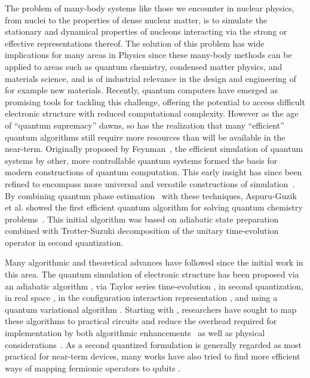 \documentclass[10pt]{article}
\begin{document}
The problem of many-body systems like those we encounter in nuclear physics, from nuclei to the properties of dense nuclear matter,  is to simulate the stationary and dynamical 
properties of nucleons interacting via the strong or effective representations thereof. The solution of this problem has wide implications for many areas in Physics since these many-body methods can be applied to areas such as
quantum chemistry, condensed matter physics, and materials science,
and is of industrial relevance in the design and engineering of for example new materials. 
Recently, quantum computers
have emerged as promising tools for tackling this challenge, offering
the potential to access difficult electronic structure with reduced
computational complexity. However as the age of ``quantum supremacy''
dawns, so has the realization that many ``efficient'' quantum
algorithms still require more resources than will be available in the
near-term.
Originally proposed by Feynman~\cite{Feynman1982}, the efficient
simulation of quantum systems by other, more controllable quantum
systems formed the basis for modern constructions of quantum
computation.  This early insight has since been refined to encompass
more universal and versatile constructions of
simulation~\cite{Lloyd1996,Abrams1997}. By combining quantum phase
estimation~\cite{Kitaev1995} with these techniques, Aspuru-Guzik et
al. showed the first efficient quantum algorithm for solving quantum
chemistry problems~\cite{Aspuru-Guzik2005}. This initial algorithm was
based on adiabatic state preparation combined with Trotter-Suzuki
decomposition of the unitary time-evolution operator
\cite{Trotter1959,Suzuki1993} in second quantization.

Many algorithmic and theoretical advances have followed since the
initial work in this area. The quantum simulation of electronic
structure has been proposed via an adiabatic algorithm
\cite{BabbushAQChem}, via Taylor series time-evolution
\cite{BabbushSparse1}, in second quantization, in real space
\cite{Kassal2008,Kivlichan2016}, in the configuration interaction
representation \cite{Toloui2013,BabbushSparse2}, and using a quantum
variational algorithm \cite{Peruzzo2013,McClean2015}. Starting with
\cite{Whitfield2010}, researchers have sought to map these algorithms
to practical circuits and reduce the overhead required for
implementation by both algorithmic
enhancements~\cite{Wecker2014,Poulin2014,Hastings2015,Romero2017} as
well as physical considerations~\cite{BabbushTrotter,McClean2014}. As
a second quantized formulation is generally regarded as most practical
for near-term devices, many works have also tried to find more
efficient ways of mapping fermionic operators to qubits
\cite{Seeley2012,Tranter2015,Whitfield2016,Bravyi2017,Havlicek2017}.
\end{document}
